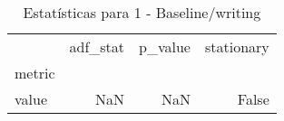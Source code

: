 \begin{table}[htbp]
\caption{Estatísticas para 1 - Baseline/writing}
\label{tab:1_-_baseline_writing_adf_test}
\begin{tabular}{lrrr}
\toprule
 & adf_stat & p_value & stationary \\
metric &  &  &  \\
\midrule
value & NaN & NaN & False \\
\bottomrule
\end{tabular}
\end{table}
